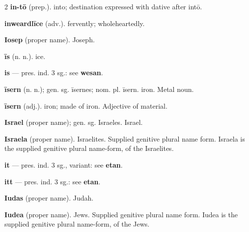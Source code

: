 \begin{multicols*}{2}
\textbf{in-tō} (prep.). into; destination expressed with dative after intō.\par
\textbf{inweardlīce} (adv.). fervently; wholeheartedly.\par
\textbf{Iosep} (proper name). Joseph.\par
\textbf{īs} (n. n.). ice.\par
\textbf{is} — pres. ind. 3 sg.: see \textbf{wesan}.\par
\textbf{īsern} (n. n.); gen. sg. īsernes; nom. pl. īsern. iron. Metal noun.\par
\textbf{īsern} (adj.). iron; made of iron. Adjective of material.\par
\textbf{Israel} (proper name); gen. sg. Israeles. Israel.\par
\textbf{Israela} (proper name). Israelites. Supplied genitive plural name form. Israela is the supplied genitive plural name-form, of the Israelites.\par
\textbf{it} — pres. ind. 3 sg., variant: see \textbf{etan}.\par
\textbf{itt} — pres. ind. 3 sg.: see \textbf{etan}.\par
\textbf{Iudas} (proper name). Judah.\par
\textbf{Iudea} (proper name). Jews. Supplied genitive plural name form. Iudea is the supplied genitive plural name-form, of the Jews.\par

\end{multicols*}
